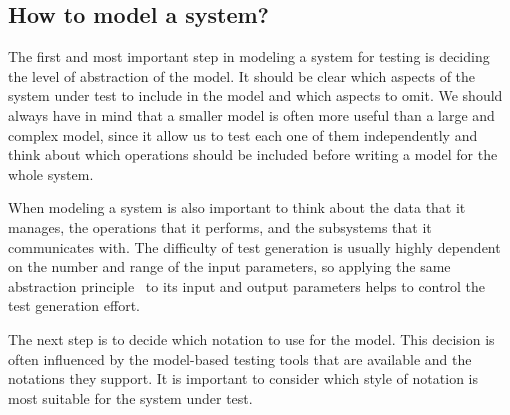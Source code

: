 \subsection{How to model a system?}

The first and most important step in modeling a system for testing is deciding the level of abstraction of the model. It should be clear which aspects of the system under test to include in the model and which aspects to omit. We should always have in mind that a smaller model is often more useful than a large and complex model, since it allow us to test each one of them independently and think about which operations should be included before writing a model for the whole system. 

When modeling a system is also important to think about the data that it manages, the operations that it performs, and the subsystems that it communicates with. The difficulty of test generation is usually highly dependent on the number and range of the input parameters, so applying the same abstraction principle~\cite{Mosley2002} to its input and output parameters helps to control the test generation effort.

The next step is to decide which notation to use for the model. This decision is
often influenced by the model-based testing tools that are available and the
notations they support. It is important to consider which style of notation is
most suitable for the system under test.

